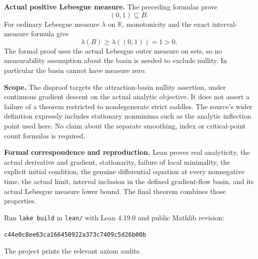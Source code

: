 \documentclass[11pt,a4paper]{article}
\begin{document}
\textbf{Actual positive Lebesgue measure.}
The preceding formulas prove
\[
 (0,1)\subseteq B.
\]
For ordinary Lebesgue measure $\lambda$ on $\mathbb R$,
monotonicity and the exact interval-measure formula give
\[
 \lambda(B)\geq\lambda((0,1))=1>0.
\]
The formal proof uses the actual Lebesgue outer measure on sets,
so no measurability assumption about the basin is needed to
exclude nullity. In particular the basin cannot have measure zero.

\textbf{Scope.}
The disproof targets the attraction-basin nullity assertion,
under continuous gradient descent on the actual analytic
objective. It does not assert a failure of a theorem restricted
to nondegenerate strict saddles. The source's wider definition
expressly includes stationary nonminima such as the analytic
inflection point used here.
No claim about the separate smoothing, index or critical-point
count formulas is required.

\textbf{Formal correspondence and reproduction.}
Lean proves real analyticity, the actual derivative and gradient,
stationarity, failure of local minimality, the explicit initial
condition, the genuine differential equation at every
nonnegative time, the actual limit, interval inclusion in the
defined gradient-flow basin, and its actual Lebesgue measure
lower bound. The final theorem combines those properties.

Run \texttt{lake build} in \texttt{lean/} with Lean 4.19.0 and
public Mathlib revision:
\begin{center}\small
\texttt{c44e0c8ee63ca166450922a373c7409c5d26b00b}
\end{center}
The project prints the relevant axiom audits.
\end{document}

